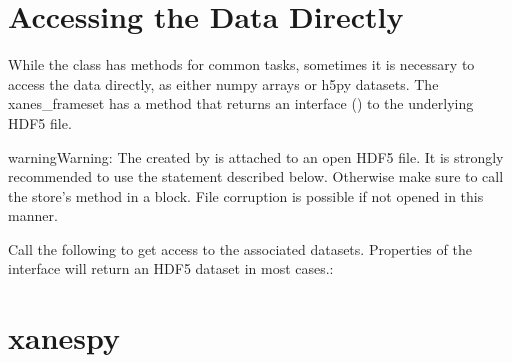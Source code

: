\documentclass[letterpaper,10pt,english]{sphinxmanual}
\begin{document}
\chapter{Accessing the Data Directly}
\label{\detokenize{data_stores:accessing-the-data-directly}}\label{\detokenize{data_stores::doc}}
While the  class has methods for common tasks,
sometimes it is necessary to access the data directly, as either numpy
arrays or h5py datasets. The xanes\_frameset has a  method
that returns an interface () to the underlying HDF5 file.

\begin{sphinxadmonition}{warning}{Warning:}
The  created by  is
attached to an open HDF5 file. It is strongly recommended to use
the  statement described below. Otherwise make sure to call
the store's  method in a 
block. File corruption is possible if not opened in this manner.
\end{sphinxadmonition}

Call the following to get access to the associated datasets. Properties of the interface will
return an HDF5 dataset in most cases.:

\begin{sphinxVerbatim}[commandchars=\\\{\}]
   
  

   
          
        
\end{sphinxVerbatim}


\chapter{xanespy}
\label{\detokenize{modules::doc}}\label{\detokenize{modules:xanespy}}
\end{document}
